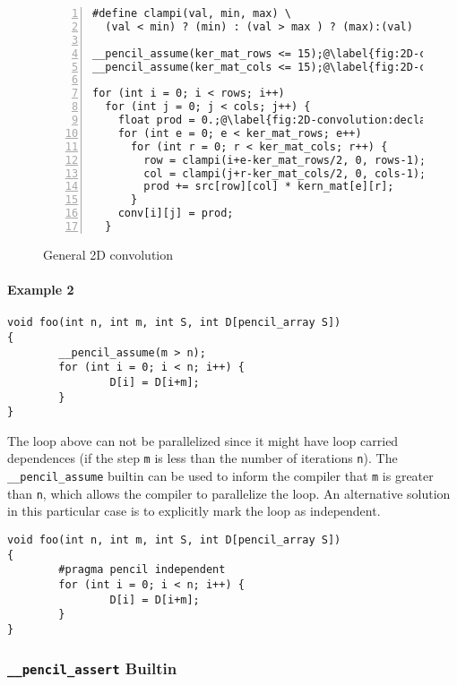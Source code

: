 \begin{figure}[t]
\begin{lstlisting}[stepnumber=1,numbers=left,numberstyle={\tiny\tt},numbersep=5pt,escapechar=@,language=pencil]
#define clampi(val, min, max) \
  (val < min) ? (min) : (val > max ) ? (max):(val)

__pencil_assume(ker_mat_rows <= 15);@\label{fig:2D-convolution:assume1}@
__pencil_assume(ker_mat_cols <= 15);@\label{fig:2D-convolution:assume2}@

for (int i = 0; i < rows; i++)
  for (int j = 0; j < cols; j++) {
    float prod = 0.;@\label{fig:2D-convolution:declaration}@
    for (int e = 0; e < ker_mat_rows; e++)
      for (int r = 0; r < ker_mat_cols; r++) {
        row = clampi(i+e-ker_mat_rows/2, 0, rows-1);
        col = clampi(j+r-ker_mat_cols/2, 0, cols-1);
        prod += src[row][col] * kern_mat[e][r];
      }
    conv[i][j] = prod;
  }
\end{lstlisting}
\caption{General 2D convolution}
\label{fig:2D-convolution}
\vskip-0.5cm
\end{figure}
  
\paragraph{Example 2}
  \begin{lstlisting}[language=pencil]
void foo(int n, int m, int S, int D[pencil_array S])
{
        __pencil_assume(m > n);
        for (int i = 0; i < n; i++) {
                D[i] = D[i+m];
        }
}
  \end{lstlisting}
The loop above can not be parallelized since it might have loop
carried dependences (if the step \lstinline!m! is less than the
number of iterations \lstinline!n!).
The \lstinline!__pencil_assume! builtin can be used to inform the compiler that
\lstinline!m! is greater than \lstinline!n!, which allows the compiler
to parallelize the loop.
An alternative solution in this particular case is to explicitly
mark the loop as independent.

  \begin{lstlisting}[language=pencil]
void foo(int n, int m, int S, int D[pencil_array S])
{
        #pragma pencil independent
        for (int i = 0; i < n; i++) {
                D[i] = D[i+m];
        }
}
  \end{lstlisting}


\subsubsection{\texttt{\_\_pencil\_assert} Builtin}

